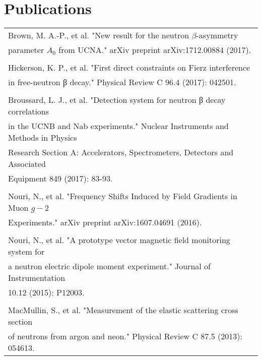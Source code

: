 \documentclass[final]{ukthesis}
\begin{document}
\section*{Publications}
\begin{tabular} {l}
  Brown, M. A.-P., et al. "New result for the neutron $\beta$-asymmetry \\
  parameter $ A_0 $ from UCNA." arXiv preprint arXiv:1712.00884 (2017). \\
  \\
  Hickerson, K. P., et al. "First direct constraints on Fierz interference \\
  in free-neutron β decay." Physical Review C 96.4 (2017): 042501.\\
  \\
  Broussard, L. J., et al. "Detection system for neutron β decay correlations\\
  in the UCNB and Nab experiments." Nuclear Instruments and Methods in Physics\\
  Research Section A: Accelerators, Spectrometers, Detectors and Associated\\
  Equipment 849 (2017): 83-93.\\
  \\
  Nouri, N., et al. "Frequency Shifts Induced by Field Gradients in Muon $g-2$\\
  Experiments." arXiv preprint arXiv:1607.04691 (2016).\\
  \\
  Nouri, N., et al. "A prototype vector magnetic field monitoring system for \\
  a neutron electric dipole moment experiment." Journal of Instrumentation\\
  10.12 (2015): P12003.\\
  \\
  MacMullin, S., et al. "Measurement of the elastic scattering cross section \\
  of neutrons from argon and neon." Physical Review C 87.5 (2013): 054613.
  
\end{tabular}
\end{document}
